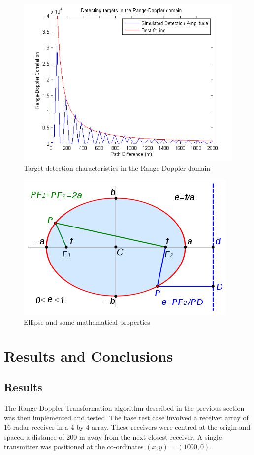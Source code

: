 \documentclass[12pt,openany,a4paper]{book}
\begin{document}
\begin{figure}[p]
\centering
\includegraphics{detect.png}
\caption{Target detection characteristics in the Range-Doppler domain}
\label{fig:detect}
\end{figure}

\begin{figure}[p]
\centering
\includegraphics{ell1.png}
\caption{Ellipse and some mathematical properties \cite{ellPic}}
\label{fig:ell1}
\end{figure}

\cleardoublepage

\chapter{Results and Conclusions}

\section{Results}
\label{sec:res}
The Range-Doppler Transformation algorithm described in the previous section was then implemented and tested. The base test case involved a receiver array of 16 radar receiver in a 4 by 4 array. These receivers were centred at the origin and spaced a distance of 200 m away from the next closest receiver. A single transmitter was positioned at the co-ordinates $(x,y) = (1000,0)$. 
\end{document}
